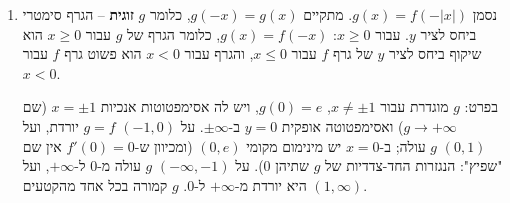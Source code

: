 \begin{solution}
\begin{enumerate}
  \item נסמן $g(x)=f(-|x|)$. מתקיים $g(-x)=g(x)$, כלומר $g$ \textbf{זוגית} – הגרף סימטרי ביחס לציר $y$. עבור $x\ge0$: $g(x)=f(-x)$, כלומר הגרף של $g$ עבור $x\ge0$ הוא שיקוף ביחס לציר $y$ של גרף $f$ עבור $x\le 0$, והגרף עבור $x<0$ הוא פשוט גרף $f$ עבור $x<0$.

  בפרט: $g$ מוגדרת עבור $x\neq\pm1$, $g(0)=e$, ויש לה אסימפטוטות אנכיות $x=\pm1$ (שם $g\to+\infty$) ואסימפטוטה אופקית $y=0$ ב-$\pm\infty$. על $(-1,0)$ $g=f$ יורדת, ועל $(0,1)$ $g$ עולה; ב-$x=0$ יש מינימום מקומי $(0,e)$ (ומכיוון ש-$f'(0)=0$ אין שם "שפיץ": הנגזרות החד-צדדיות של $g$ שתיהן $0$). על $(-\infty,-1)$ $g$ עולה מ-$0$ ל-$+\infty$, ועל $(1,\infty)$ היא יורדת מ-$+\infty$ ל-$0$. $g$ קמורה בכל אחד מהקטעים.
\end{enumerate}
\end{solution}
